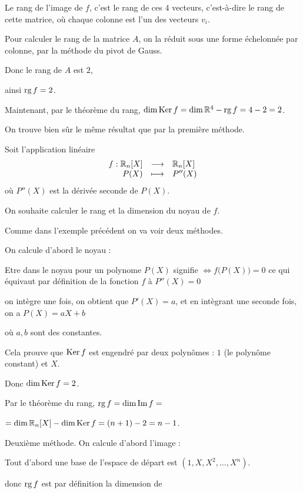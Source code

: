 \change
Le rang de l'image de $f$, c'est le rang de ces $4$ vecteurs, c'est-à-dire 
le rang de cette matrice, où chaque colonne est l'un des vecteurs $v_i$.

\change
Pour calculer le rang de la matrice $A$, on la réduit sous une forme échelonnée 
par colonne, par la méthode du pivot de Gauss.


\change
Donc le rang de $A$ est $2$, 

\change
ainsi $\mathop{\text{rg}}\nolimits f  = 2$.

\change
Maintenant, par le théorème du rang, 
$\dim \mathop{\text{Ker}}\nolimits f = \dim \mathbb{R}^4 - \mathop{\text{rg}}\nolimits f = 4-2 =2$.

On trouve bien sûr le même résultat que par la première méthode.


\diapo

Soit l'application linéaire 
$$\begin{array}{rcl}
f : \mathbb{R}_n[X] &\longrightarrow&  \mathbb{R}_n[X] \\
        P(X) &\longmapsto& P''(X) 
  \end{array}$$
où $P''(X)$ est la dérivée seconde de $P(X)$.

\change
On souhaite calculer le rang et la dimension du noyau de $f$.

\change
Comme dans l'exemple précédent on va voir deux méthodes.

  On calcule d'abord le noyau :
  
  \change
  Etre dans le noyau pour un polynome $P(X)$
  signifie $ \iff f\big(P(X)\big) = 0$ ce qui équivaut par définition de la fonction $f$ à $P''(X) = 0$
  
  on intègre une fois, on obtient que $P'(X)=a$, et en intègrant une seconde fois, on a $P(X) = aX+b$
  
  où $a,b$ sont des constantes.
  
  \change
  Cela prouve que $\mathop{\text{Ker}}\nolimits f$ est engendré par deux polynômes : $1$ (le polynôme constant) 
  et $X$.  
  
  Donc $\dim \mathop{\text{Ker}}\nolimits f = 2$.
  
  \change
  Par le théorème du rang, $\mathop{\text{rg}}\nolimits f = \dim \mathop{\text{Im}}\nolimits f =$
  
  $= \dim \mathbb{R}_n[X] - \dim \mathop{\text{Ker}}\nolimits f = (n+1) - 2 = n-1$.
  
  \change
  Deuxième méthode. On calcule d'abord l'image :
  
  \change
  Tout d'abord  une base de l'espace de départ est $(1,X,X^2,\ldots,X^n)$.
  
  \change
  donc $\mathop{\text{rg}}\nolimits f$ est par définition la dimension de 
  
